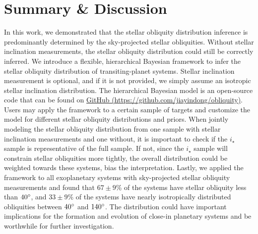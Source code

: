 \documentclass[twocolumn,times]{aastex631}
\begin{document}
\section{Summary \& Discussion}

In this work, we demonstrated that the stellar obliquity distribution inference is predominantly determined by the sky-projected stellar obliquities. Without stellar inclination measurements, the stellar obliquity distribution could still be correctly inferred.
We introduce a flexible, hierarchical Bayesian framework to infer the stellar obliquity distribution of transiting-planet systems. Stellar inclination measurement is optional, and if it is not provided, we simply assume an isotropic stellar inclination distribution. The hierarchical Bayesian model is an open-source code that can be found on \href{https://github.com/jiayindong/obliquity}{GitHub\,\faGithub\,(https://github.com/jiayindong/obliquity)}. Users may apply the framework to a certain sample of targets and customize the model for different stellar obliquity distributions and priors.
When jointly modeling the stellar obliquity distribution from one sample with stellar inclination measurements and one without, it is important to check if the $i_\star$ sample is representative of the full sample. If not, since the $i_\star$ sample will constrain stellar obliquities more tightly, the overall distribution could be weighted towards these systems, bias the interpretation.
Lastly, we applied the framework to all exoplanetary systems with sky-projected stellar obliquity measurements and found that $67\pm9$\% of the systems have stellar obliquity less than $40\mbox{$^\circ$}$, and $33\pm9$\% of the systems have nearly isotropically distributed obliquities between $40\mbox{$^\circ$}$ and $140\mbox{$^\circ$}$.
The distribution could have important implications for the formation and evolution of close-in planetary systems and be worthwhile for further investigation.

\vspace*{5mm}



\end{document}

